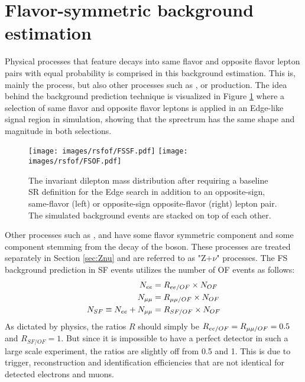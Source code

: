 \section{Flavor-symmetric background estimation}\label{sec:fsBG}
\noindent
\justify
Physical processes that feature decays into same flavor and opposite flavor lepton pairs with equal probability is comprised in this background estimation. 
This is, mainly the \ttbar process, but also other processes such as \PWW, or \ttW production.
The idea behind the background prediction technique is visualized in Figure \ref{fig:rsfofMC} where a selection of same flavor and opposite flavor leptons is applied in an Edge-like signal region in simulation, showing that the \ttbar sprectrum has the same shape and magnitude in both selections.    
\begin{figure}[htbp!]
\begin{center}
    \texttt{[image: images/rsfof/FSSF.pdf]}
    \texttt{[image: images/rsfof/FSOF.pdf]} 
    \caption{The invariant dilepton mass distribution after requiring a baseline SR definition for the Edge search in addition to an opposite-sign, same-flavor (left) or opposite-sign opposite-flavor (right) lepton pair. The simulated background events are stacked on top of each other.}
\label{fig:rsfofMC}
\end{center}
\end{figure}                                                                               
Other processes such as \PWZ, \PZZ and \ttZ have some flavor symmetric component and some component stemming from the decay of the \PZ boson.
These processes are treated separately in Section \ref{sec:Znu} and are referred to as "Z+$\nu$" processes. 
The FS background prediction in SF events utilizes the number of OF events as follows:
\begin{align}
\label{eq:masterformula}
    N_{ee} & = R_{ee/OF} \times N_{OF}\notag \\
    N_{\mu\mu} & = R_{\mu\mu/OF} \times N_{OF}\notag\\
    N_{SF} \equiv N_{ee} + N_{\mu\mu} & = R_{SF/OF} \times N_{OF}
\end{align}
As dictated by physics, the ratios $R$ should simply be $R_{ee/OF}=R_{\mu\mu/OF}=0.5$ and $R_{SF/OF}=1$.
But since it is impossible to have a perfect detector in such a large scale experiment, the ratios are slightly off from 0.5 and 1. 
This is due to trigger, reconstruction and identification efficiencies that are not identical for detected electrons and muons. 
